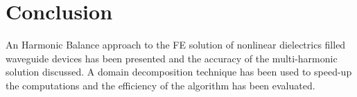\documentclass[journal]{IEEEtran}
\begin{document}
\section{Conclusion}
An Harmonic Balance approach to the FE solution of nonlinear dielectrics filled waveguide devices has been presented and the accuracy of the multi-harmonic solution discussed.%
A domain decomposition technique has been used to speed-up the computations and the efficiency of the algorithm has been evaluated.



%
%





%






\end{document}
